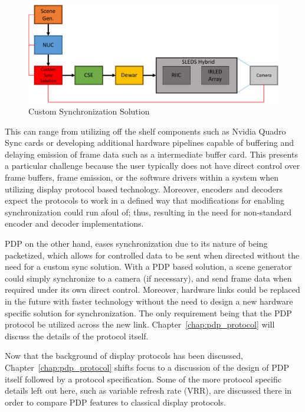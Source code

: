     \begin{figure}
        \centering
        \includegraphics[width=1.0\textwidth]{fig/custom_sync.pdf}
        \caption{Custom Synchronization Solution}
        \label{fig:custom_sync}
    \end{figure}

    This can range from utilizing off the shelf components such as Nvidia Quadro Sync cards\cite{NVIDIAQuadroSync} or developing additional hardware pipelines capable of buffering and delaying emission of frame data such as a intermediate buffer card. This presents a particular challenge because the user typically does not have direct control over frame buffers, frame emission, or the software drivers within a system when utilizing display protocol based technology. Moreover, encoders and decoders expect the protocols to work in a defined way that modifications for enabling synchronization could run afoul of; thus, resulting in the need for non-standard encoder and decoder implementations.

    PDP on the other hand, eases synchronization due to its nature of being packetized, which allows for controlled data to be sent when directed without the need for a custom sync solution. With a PDP based solution, a scene generator could simply synchronize to a camera (if necessary), and send frame data when required under its own direct control. Moreover, hardware links could be replaced in the future with faster technology without the need to design a new hardware specific solution for synchronization. The only requirement being that the PDP protocol be utilized across the new link. Chapter~\ref{chap:pdp_protocol} will discuss the details of the protocol itself.

    Now that the background of display protocols has been discussed, Chapter~\ref{chap:pdp_protocol} shifts focus to a discussion of the design of PDP itself followed by a protocol specification. Some of the more protocol specific details left out here, such as variable refresh rate (VRR), are discussed there in order to compare PDP features to classical display protocols.
